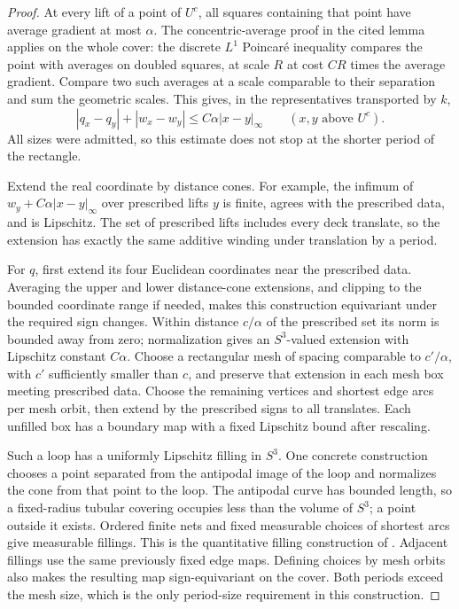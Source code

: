 \begin{proof}
At every lift of a point of \(U^c\), all squares containing that point
have average gradient at most \(\alpha\).  The concentric-average proof
in the cited lemma applies on the whole cover: the discrete
\(L^1\) Poincar\'e inequality compares the point with averages on doubled
squares, at scale \(R\) at cost \(CR\) times the average gradient.
Compare two such averages at a scale comparable to their separation
and sum the geometric scales.  This gives, in the representatives
transported by \(k\),
\[
 |q_x-q_y|+|w_x-w_y|\le C\alpha|x-y|_\infty
 \qquad(x,y\text{ above }U^c).
\]
All sizes were admitted, so this estimate does not stop at the shorter
period of the rectangle.

Extend the real coordinate by distance cones.  For example, the infimum
of \(w_y+C\alpha|x-y|_\infty\) over prescribed lifts \(y\) is finite,
agrees with the prescribed data, and is Lipschitz.  The set of prescribed
lifts includes every deck translate, so the extension has exactly the
same additive winding under translation by a period.

For \(q\), first extend its four Euclidean coordinates near the
prescribed data.  Averaging the upper and lower distance-cone extensions,
and clipping to the bounded coordinate range if needed, makes this
construction equivariant under the required sign changes.  Within
distance \(c/\alpha\) of the prescribed set its norm is bounded away
from zero; normalization gives an \(S^3\)-valued extension with Lipschitz
constant \(C\alpha\).  Choose a rectangular mesh of spacing comparable
to \(c'/\alpha\), with \(c'\) sufficiently smaller than \(c\), and
preserve that extension in each mesh box meeting prescribed data.
Choose the remaining vertices and shortest edge arcs per mesh orbit,
then extend by the prescribed signs to all translates.  Each unfilled
box has a boundary map with a fixed Lipschitz bound after rescaling.

Such a loop has a uniformly Lipschitz filling in \(S^3\).  One concrete
construction chooses a point separated from the antipodal image of the
loop and normalizes the cone from that point to the loop.  The antipodal curve
has bounded length, so a fixed-radius tubular covering occupies less
than the volume of \(S^3\); a point outside it exists.  Ordered finite
nets and fixed measurable choices of shortest arcs give measurable
fillings.  This is the quantitative filling construction of
\cite[Lemma ``Quantitative filling on \(S^3\)'', Section ``Relative
comparison of the retained densities'']{SharpO4}.  Adjacent fillings use
the same previously fixed edge maps.  Defining choices by mesh orbits
also makes the resulting map sign-equivariant on the cover.  Both
periods exceed the mesh size, which is the only period-size requirement
in this construction.


\end{proof}
